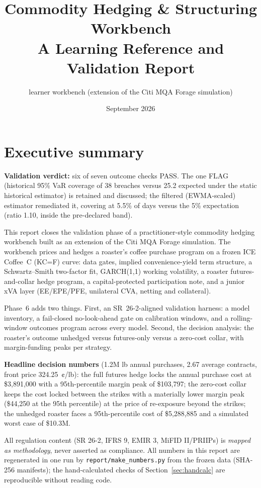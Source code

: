 \documentclass[11pt,a4paper]{article}
\title{Commodity Hedging \& Structuring Workbench\\
\large A Learning Reference and Validation Report}
\author{learner workbench (extension of the Citi MQA Forage simulation)}
\date{September 2026}
\newcommand{\usd}{\$}
\begin{document}
\maketitle

\section*{Executive summary}


\textbf{Validation verdict:} six of seven outcome checks PASS. The one
FLAG (historical 95\% VaR coverage of 38 breaches versus 25.2 expected
under the static historical estimator) is retained and discussed; the
filtered (EWMA-scaled) estimator remediated it, covering at 5.5\% of days
versus the 5\% expectation (ratio 1.10, inside the pre-declared band).

This report closes the validation phase of a practitioner-style commodity
hedging workbench built as an extension of the Citi MQA Forage simulation.
The workbench prices and hedges a roaster's coffee purchase program on a
frozen ICE Coffee~C (KC=F) curve: data gates, implied convenience-yield
term structure, a Schwartz--Smith two-factor fit, GARCH(1,1) working
volatility, a roaster futures-and-collar hedge program, a capital-protected
participation note, and a junior xVA layer (EE/EPE/PFE, unilateral CVA,
netting and collateral).

Phase~6 adds two things. First, an SR~26-2-aligned validation harness: a
model inventory, a fail-closed no-look-ahead gate on calibration windows,
and a rolling-window outcomes program across every model. Second, the
decision analysis: the roaster's outcome unhedged versus futures-only
versus a zero-cost collar, with margin-funding peaks per strategy.

\textbf{Headline decision numbers} (1.2M lb annual purchases, 2.67 average
contracts, front price 324.25~¢/lb): the full futures hedge locks the
annual purchase cost at \usd{}3,891,000 with a 95th-percentile margin peak
of \usd{}103,797; the zero-cost collar keeps the cost locked between the
strikes with a materially lower margin peak (\usd{}44,250 at the 95th
percentile) at the price of re-exposure beyond the strikes; the unhedged
roaster faces a 95th-percentile cost of \usd{}5,288,885 and a simulated
worst case of \usd{}10.3M.


All regulation content (SR 26-2, IFRS 9, EMIR 3, MiFID II/PRIIPs) is
\emph{mapped as methodology}, never asserted as compliance. All numbers in
this report are regenerated in one run by \texttt{report/make\_numbers.py}
from the frozen data (SHA-256 manifests); the hand-calculated checks of
Section~\ref{sec:handcalc} are reproducible without reading code.
\end{document}
